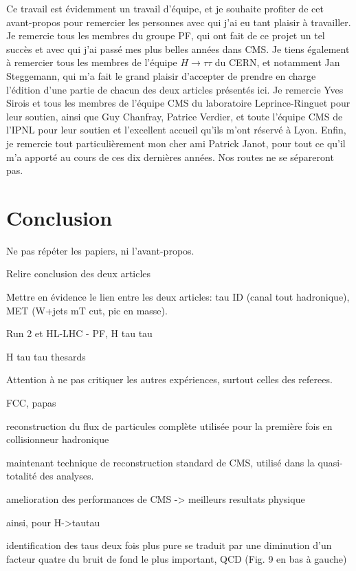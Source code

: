 \documentclass[11pt,twoside,a4paper,tdr]{cms-tdr}
\begin{document}
Ce travail est évidemment un travail d'équipe, et je souhaite profiter de cet avant-propos pour remercier les personnes avec qui j'ai eu tant plaisir à travailler.  
Je remercie tous les membres du groupe PF, qui ont fait de ce projet un tel succès et avec qui j'ai passé mes plus belles années dans CMS.  
Je tiens également à remercier tous les membres de l'équipe $H \to \tau \tau$ du CERN, et notamment Jan Steggemann, qui m'a fait le grand plaisir d'accepter de prendre en charge l'édition d'une partie de chacun des deux articles présentés ici.  
Je remercie Yves Sirois et tous les membres de l'équipe CMS du laboratoire Leprince-Ringuet pour leur soutien, 
ainsi que Guy Chanfray, Patrice Verdier, et toute l'équipe CMS de l'IPNL pour leur soutien et l'excellent accueil qu'ils m'ont réservé à Lyon. 
Enfin, je remercie tout particulièrement mon cher ami Patrick Janot, pour tout ce qu'il m'a apporté au cours de ces dix dernières années. Nos routes ne se sépareront pas. 

\newpage 

\section*{Conclusion} 

Ne pas répéter les papiers, ni l'avant-propos. 

Relire conclusion des deux articles

Mettre en évidence le lien entre les deux articles: tau ID (canal tout hadronique), MET (W+jets mT cut, pic en masse).

Run 2 et HL-LHC 
- PF, H tau tau 

H tau tau thesards 

Attention à ne pas critiquer les autres expériences, surtout celles des referees. 


FCC, papas



reconstruction du flux de particules complète utilisée pour la première fois en collisionneur hadronique

maintenant technique de reconstruction standard de CMS, utilisé dans la quasi-totalité des analyses. 

amelioration des performances de CMS -> meilleurs resultats physique

ainsi, pour H->tautau

identification des taus deux fois plus pure se traduit par une diminution d'un facteur quatre du bruit de fond le plus important, QCD (Fig. 9 en bas à gauche)
\end{document}
